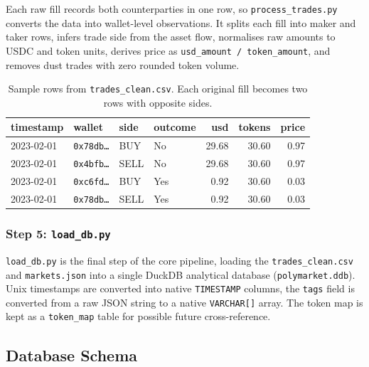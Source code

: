 \documentclass[11pt,a4paper]{article}
\begin{document}
Each raw fill records both counterparties in one row, so
 \texttt{process\_trades.py} converts the data into wallet-level observations.
  It splits each fill into maker and taker rows, infers trade side from the asset flow,
   normalises raw amounts to USDC and token units, derives price as \texttt{usd\_amount / token\_amount}, 
   and removes dust trades with zero rounded token volume.

\begin{table}[H]
\centering
\caption{Sample rows from \texttt{trades\_clean.csv}. Each original
         fill becomes two rows with opposite sides.}
\label{tab:clean_sample}
\small
\begin{tabularx}{\textwidth}{l l l l r r r}
\toprule
\textbf{timestamp} & \textbf{wallet} & \textbf{side} &
\textbf{outcome} & \textbf{usd} & \textbf{tokens} & \textbf{price} \\
\midrule
2023-02-01 & \texttt{0x78db{\ldots}} & BUY  & No  & 29.68 & 30.60 & 0.97 \\
2023-02-01 & \texttt{0x4bfb{\ldots}} & SELL & No  & 29.68 & 30.60 & 0.97 \\
2023-02-01 & \texttt{0xc6fd{\ldots}} & BUY  & Yes &  0.92 & 30.60 & 0.03 \\
2023-02-01 & \texttt{0x78db{\ldots}} & SELL & Yes &  0.92 & 30.60 & 0.03 \\
\bottomrule
\end{tabularx}
\end{table}


  
\subsubsection*{Step 5: \texttt{load\_db.py}}

\texttt{load\_db.py} is the final step of the core pipeline, loading the
\texttt{trades\_clean.csv} and \texttt{markets.json} into a single
DuckDB analytical database (\texttt{polymarket.ddb}).
Unix timestamps are converted into native \texttt{TIMESTAMP} columns, the
\texttt{tags} field is converted from a raw JSON string to a native
\texttt{VARCHAR[]} array.
The token map is kept as a \texttt{token\_map} table for possible future
cross-reference.


\subsection{Database Schema}
\label{sec:schema}
\end{document}
